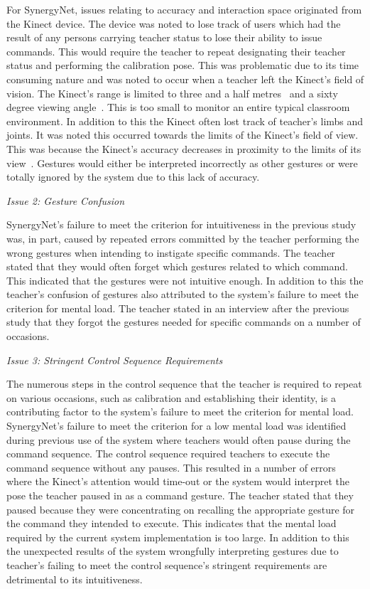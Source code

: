 \documentclass[link]{IWCOMP}
\begin{document}
For SynergyNet, issues relating to accuracy and interaction space originated from the Kinect device.
The device was noted to lose track of users which had the result of any persons carrying teacher status to lose their ability to issue commands.
This would require the teacher to repeat designating their teacher status and performing the calibration pose.
This was problematic due to its time consuming nature and was noted to occur when a teacher left the Kinect's field of vision.
The Kinect's range is limited to three and a half metres~\cite{Maimone2011} and a sixty degree viewing angle~\cite{Stone2011}.
This is too small to monitor an entire typical classroom environment.
In addition to this the Kinect often lost track of teacher's limbs and joints.
It was noted this occurred towards the limits of the Kinect's field of view.
This was because the Kinect's accuracy decreases in proximity to the limits of its view~\cite{Mehrotra2011}.
Gestures would either be interpreted incorrectly as other gestures or were totally ignored by the system due to this lack of accuracy.

\emph{Issue 2: Gesture Confusion}

SynergyNet's failure to meet the criterion for intuitiveness in the previous study was, in part, caused by repeated errors committed by the teacher performing the wrong gestures when intending to instigate specific commands.
The teacher stated that they would often forget which gestures related to which command.
This indicated that the gestures were not intuitive enough.
In addition to this the teacher's confusion of gestures also attributed to the system's failure to meet the criterion for mental load.
The teacher stated in an interview after the previous study that they forgot the gestures needed for specific commands on a number of occasions.

\emph{Issue 3: Stringent Control Sequence Requirements}

The numerous steps in the control sequence that the teacher is required to repeat on various occasions, such as calibration and establishing their identity, is a contributing factor to the system's failure to meet the criterion for mental load.
SynergyNet's failure to meet the criterion for a low mental load was identified during previous use of the system where teachers would often pause during the command sequence.
The control sequence required teachers to execute the command sequence without any pauses.
This resulted in a number of errors where the Kinect's attention would time-out or the system would interpret the pose the teacher paused in as a command gesture.
The teacher stated that they paused because they were concentrating on recalling the appropriate gesture for the command they intended to execute.
This indicates that the mental load required by the current system implementation is too large.
In addition to this the unexpected results of the system wrongfully interpreting gestures due to teacher's failing to meet the control sequence's stringent requirements are detrimental to its intuitiveness.
\end{document}
